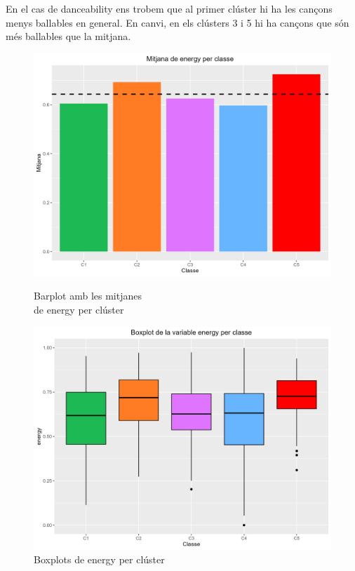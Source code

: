 En el cas de danceability ens trobem que al primer clúster hi ha les cançons menys ballables en general. En canvi, en els clústers 3 i 5 hi ha cançons que són més ballables que la mitjana. 

\begin{figure}[H]
\centering
    \begin{minipage}{.49\textwidth}
        \centering
        \includegraphics[width=0.95\linewidth]{Images/5_Profiling/numeriques/Num_BarPlot_energy.png}
        \caption{Barplot amb les mitjanes \\ de energy per clúster}
        \label{fig:Num_BarPlot_energy}
    \end{minipage}%
    \begin{minipage}{.49\textwidth}
        \centering
        \includegraphics[width=0.95\linewidth]{Images/5_Profiling/numeriques/Num_BoxPlot_energy.png}
        \caption{Boxplots de energy per clúster}
        \label{fig:Num_BoxPlot_energy}
    \end{minipage}%
\end{figure}
